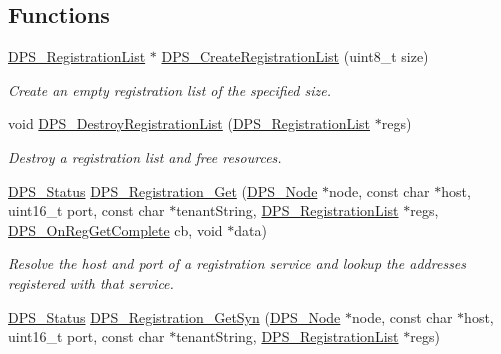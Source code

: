 \subsection*{Functions}
\begin{DoxyCompactItemize}
\item 
\hyperlink{group__registration_ga2b9489ff306ad253d24b03c418a6eda0}{D\+P\+S\+\_\+\+Registration\+List} $\ast$ \hyperlink{group__registration_ga3d1f2e10a8d3ffd66cf4c3ba5c53b490}{D\+P\+S\+\_\+\+Create\+Registration\+List} (uint8\+\_\+t size)
\begin{DoxyCompactList}\small\item\em Create an empty registration list of the specified size. \end{DoxyCompactList}\item 
void \hyperlink{group__registration_ga0dbaa5dbea47290035a11dc22fc45f2d}{D\+P\+S\+\_\+\+Destroy\+Registration\+List} (\hyperlink{group__registration_ga2b9489ff306ad253d24b03c418a6eda0}{D\+P\+S\+\_\+\+Registration\+List} $\ast$regs)
\begin{DoxyCompactList}\small\item\em Destroy a registration list and free resources. \end{DoxyCompactList}\item 
\hyperlink{group__status_ga30395a84d3cad9d4ec29848106415038}{D\+P\+S\+\_\+\+Status} \hyperlink{group__registration_ga7288d76e731feb67b22951d7d1966311}{D\+P\+S\+\_\+\+Registration\+\_\+\+Get} (\hyperlink{group__node_ga4dd612ab965134321bb57fdb065f121c}{D\+P\+S\+\_\+\+Node} $\ast$node, const char $\ast$host, uint16\+\_\+t port, const char $\ast$tenant\+String, \hyperlink{group__registration_ga2b9489ff306ad253d24b03c418a6eda0}{D\+P\+S\+\_\+\+Registration\+List} $\ast$regs, \hyperlink{group__registration_gad6b4f95f999e950345587b5ae2de69e2}{D\+P\+S\+\_\+\+On\+Reg\+Get\+Complete} cb, void $\ast$data)
\begin{DoxyCompactList}\small\item\em Resolve the host and port of a registration service and lookup the addresses registered with that service. \end{DoxyCompactList}\item 
\hyperlink{group__status_ga30395a84d3cad9d4ec29848106415038}{D\+P\+S\+\_\+\+Status} \hyperlink{group__registration_ga189dc57b265d83d6503f18e953759559}{D\+P\+S\+\_\+\+Registration\+\_\+\+Get\+Syn} (\hyperlink{group__node_ga4dd612ab965134321bb57fdb065f121c}{D\+P\+S\+\_\+\+Node} $\ast$node, const char $\ast$host, uint16\+\_\+t port, const char $\ast$tenant\+String, \hyperlink{group__registration_ga2b9489ff306ad253d24b03c418a6eda0}{D\+P\+S\+\_\+\+Registration\+List} $\ast$regs)

\end{DoxyCompactItemize}
